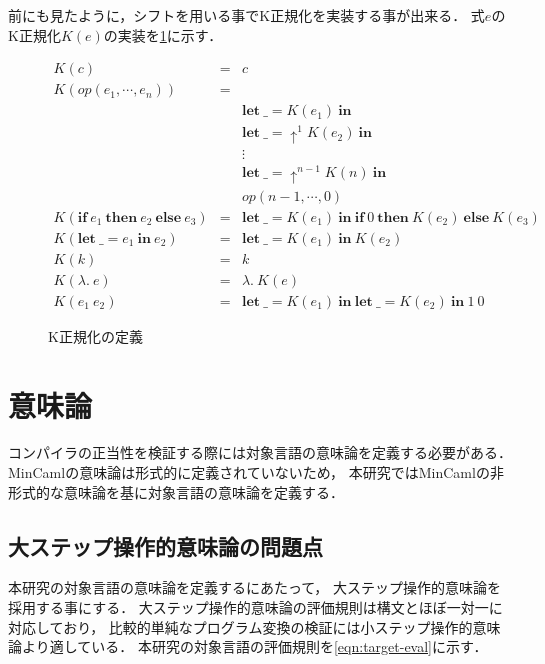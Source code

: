 \documentclass[T]{compsoft}
\newcommand{\keyword}[1]{\mathbf{#1}}
\newcommand{\IF}{\keyword{if}}
\newcommand{\THEN}{\keyword{then}}
\newcommand{\ELSE}{\keyword{else}}
\newcommand{\LET}{\keyword{let}}
\newcommand{\IN}{\keyword{in}}
\begin{document}
前にも見たように，シフトを用いる事でK正規化を実装する事が出来る．
式$e$のK正規化$K(e)$の実装を\figurename\ref{eqn:target-knormal}に示す．
\begin{figure}[htbp]
	\[ \begin{array}{lll}
			K(c) & = & c \\
			K(\textit{op} (e_1, \cdots , e_n)) & = & \\
																					& & \LET~\_=K(e_1)~\IN \\
																 & & \LET~\_=\uparrow^1 K(e_2)~\IN \\
													 & & \vdots \\
											& & \LET~\_=\uparrow^{n-1}K(n)~\IN \\
											& & \textit{op} (n-1, \cdots, 0) \\
			K(\IF~e_1~\THEN~e_2~\ELSE~e_3) & = & \LET~\_=K(e_1)~\IN~\IF~0~\THEN~K(e_2)~\ELSE~K(e_3) \\
			K(\LET~\_=e_1~\IN~e_2) & = & \LET~\_=K(e_1)~\IN~K(e_2) \\
			K(k) & = & k \\
			K(\lambda.~e) & = & \lambda.~K(e) \\
			K(e_1~e_2) & = & \LET~\_=K(e_1)~\IN~\LET~\_=K(e_2)~\IN~1~0
	\end{array} \]
	\caption{K正規化の定義}
	\label{eqn:target-knormal}
\end{figure}

\section{意味論}\label{section:semantics}
コンパイラの正当性を検証する際には対象言語の意味論を定義する必要がある．
MinCamlの意味論は形式的に定義されていないため，
本研究ではMinCamlの非形式的な意味論を基に対象言語の意味論を定義する．

\subsection{大ステップ操作的意味論の問題点}
本研究の対象言語の意味論を定義するにあたって，
大ステップ操作的意味論を採用する事にする．
大ステップ操作的意味論の評価規則は構文とほぼ一対一に対応しており，
比較的単純なプログラム変換の検証には小ステップ操作的意味論より適している．
本研究の対象言語の評価規則を\figurename\ref{eqn:target-eval}に示す．
\end{document}
